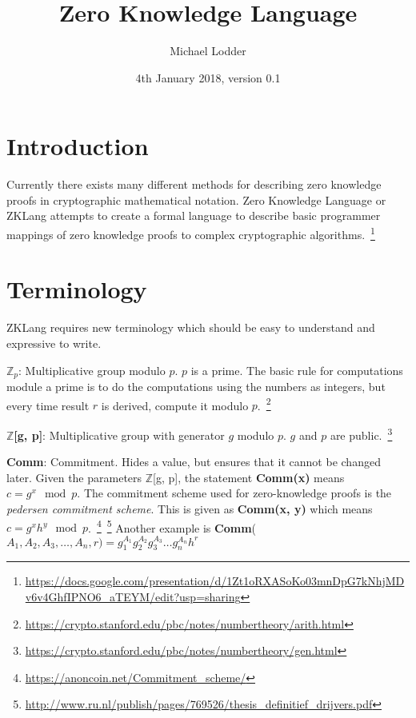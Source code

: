\documentclass[a4paper]{article}
\title{Zero Knowledge Language}
\author{Michael Lodder}
\date{4th January 2018, version 0.1}
\begin{document}
\maketitle

\section{Introduction}

Currently there exists many different methods for describing zero knowledge proofs in cryptographic mathematical notation. Zero Knowledge Language or ZKLang attempts to create a formal language to describe basic programmer mappings of zero knowledge proofs to complex cryptographic algorithms.~\footnote{\url{https://docs.google.com/presentation/d/1Zt1oRXASoKo03mnDpG7kNhjMDv6v4GhfIPNO6_aTEYM/edit?usp=sharing}}

\section{Terminology}

ZKLang requires new terminology which should be easy to understand and expressive to write.\newline

\indent $\mathbb{Z}_p$: Multiplicative group modulo $p$. $p$ is a prime. The basic rule for computations module a prime is to do the computations using the numbers as integers, but every time result $r$ is derived, compute it modulo $p$.~\footnote{\url{https://crypto.stanford.edu/pbc/notes/numbertheory/arith.html}}\newline

$\mathbb{Z}$\textbf{[g, p]}: Multiplicative group with generator $g$ modulo $p$. $g$ and $p$ are public.~\footnote{\url{https://crypto.stanford.edu/pbc/notes/numbertheory/gen.html}}\newline

\textbf{Comm}: Commitment. Hides a value, but ensures that it cannot be changed later. Given the parameters $\mathbb{Z}$[g, p], the statement \textbf{Comm(x)} means  $c=g^x\mod{p}$. The commitment scheme used for zero-knowledge proofs is the \emph{pedersen commitment scheme}. This is given as \textbf{Comm(x, y)} which means $c=g^xh^y\mod{p}$.~\footnote{\url{https://anoncoin.net/Commitment_scheme/}}~\footnote{\url{http://www.ru.nl/publish/pages/769526/thesis_definitief_drijvers.pdf}} Another example is \textbf{Comm}($A_1, A_2, A_3, \dots, A_n, r)=g_1^{A_1} g_2^{A_2} g_3^{A_3}\dots g_n^{A_n} h^r$\newline
\end{document}
